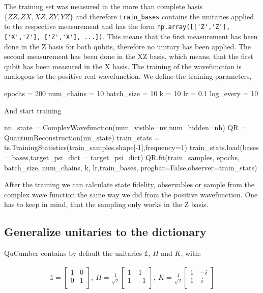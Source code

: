 \documentclass[submission, Phys]{SciPost}
\begin{document}
The training set was measured in the more than complete basis $\{ZZ, ZX, XZ, ZY, YZ \}$ and therefore \verb|train_bases| contains the unitaries applied to the respective measurement and has the form  \verb|np.array([['Z','Z'], ['X','Z'], ['Z','X'], ...])|. This means that the first measurement has been done in the Z basis for both qubits, therefore no unitary has been applied. The second measurement has been done in the XZ basis, which means, that the first qubit has been measured in the X basis. The training of the wavefunction is analogous to the positive real wavefunction. We define the training parameters,

\begin{python}
epochs     = 200
num_chains = 10
batch_size = 10
k          = 10
lr         = 0.1
log_every  = 10
\end{python}

And start training

\begin{python}
nn_state = ComplexWavefunction(num_visible=nv,num_hidden=nh)
QR = QuantumReconstruction(nn_state)
train_stats = ts.TrainingStatistics(train_samples.shape[-1],frequency=1)
train_stats.load(bases = bases,target_psi_dict = target_psi_dict)
QR.fit(train_samples, epochs, batch_size, num_chains, k,
       lr,train_bases, progbar=False,observer=train_stats)
\end{python}

After the training we can calculate state fidelity, observables or sample from the complex wave function the same way we did from the positive wavefunction. One has to keep in mind, that the sampling only works in the Z basis.

\subsection{Generalize unitaries to the dictionary}

QuCumber contains by default the unitaries $\mathds{1}$, $H$ and $K$, with:

\begin{align}
\mathds{1} = 
\begin{bmatrix}
1 &0 \\
0 &1 \\ 
\end{bmatrix},~
H = \frac{1}{\sqrt{2}} 
\begin{bmatrix}
1 &~1 \\
1 &-1 \\ 
\end{bmatrix},~
K = \frac{1}{\sqrt{2}} 
\begin{bmatrix}
1 &-i \\
1 &~i \\ 
\end{bmatrix}
\end{align} 
\end{document}
